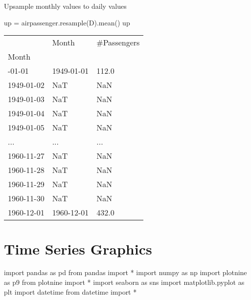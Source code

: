 \documentclass[
  letterpaper,
  DIV=11,
  numbers=noendperiod]{scrreprt}
\newenvironment{Shaded}{\begin{snugshade}}{\end{snugshade}}
\newcommand{\ImportTok}[1]{\textcolor[rgb]{0.00,0.46,0.62}{#1}}
\newcommand{\NormalTok}[1]{\textcolor[rgb]{0.00,0.23,0.31}{#1}}
\newcommand{\OperatorTok}[1]{\textcolor[rgb]{0.37,0.37,0.37}{#1}}
\newcommand{\StringTok}[1]{\textcolor[rgb]{0.13,0.47,0.30}{#1}}
\begin{document}
Upsample monthly values to daily values

\begin{Shaded}
\begin{Highlighting}[]
\NormalTok{up }\OperatorTok{=}\NormalTok{ airpassenger.resample(}\StringTok{\textquotesingle{}D\textquotesingle{}}\NormalTok{).mean()}
\NormalTok{up}
\end{Highlighting}
\end{Shaded}

\begin{longtable}[]{@{}lll@{}}
\toprule\noalign{}
& Month & \#Passengers \\
Month & & \\
\midrule\noalign{}
\endhead
\bottomrule\noalign{}
\endlastfoot
1949-01-01 & 1949-01-01 & 112.0 \\
1949-01-02 & NaT & NaN \\
1949-01-03 & NaT & NaN \\
1949-01-04 & NaT & NaN \\
1949-01-05 & NaT & NaN \\
... & ... & ... \\
1960-11-27 & NaT & NaN \\
1960-11-28 & NaT & NaN \\
1960-11-29 & NaT & NaN \\
1960-11-30 & NaT & NaN \\
1960-12-01 & 1960-12-01 & 432.0 \\
\end{longtable}


\hypertarget{time-series-graphics}{%
\chapter{Time Series Graphics}\label{time-series-graphics}}

\begin{Shaded}
\begin{Highlighting}[]
\ImportTok{import}\NormalTok{ pandas }\ImportTok{as}\NormalTok{ pd}
\ImportTok{from}\NormalTok{ pandas }\ImportTok{import} \OperatorTok{*}
\ImportTok{import}\NormalTok{ numpy }\ImportTok{as}\NormalTok{ np}
\ImportTok{import}\NormalTok{ plotnine }\ImportTok{as}\NormalTok{ p9}
\ImportTok{from}\NormalTok{ plotnine }\ImportTok{import} \OperatorTok{*}
\ImportTok{import}\NormalTok{ seaborn }\ImportTok{as}\NormalTok{ sns}
\ImportTok{import}\NormalTok{ matplotlib.pyplot }\ImportTok{as}\NormalTok{ plt}
\ImportTok{import}\NormalTok{ datetime}
\ImportTok{from}\NormalTok{ datetime }\ImportTok{import} \OperatorTok{*}
\end{Highlighting}
\end{Shaded}
\end{document}
